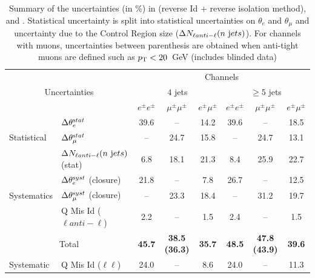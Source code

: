 \begin{table}
  \begin{center} 
{\small \begin{tabular}{|l|l|ccc|ccc|}
\hline \multicolumn{2}{|c|}{ } &  \multicolumn{6}{c|}{Channels} \\ \cline{3-8}
 \multicolumn{2}{|c|}{Uncertainties} &  \multicolumn{3}{c|}{$4$ jets} &  \multicolumn{3}{|c|}{$\ge 5$ jets} \\ \cline{3-8}
\multicolumn{2}{|c|}{} & $e^{\pm}e^{\pm}$ & $\mu^{\pm}\mu^{\pm}$ & $e^{\pm}\mu^{\pm}$ & $e^{\pm}e^{\pm}$ & $\mu^{\pm}\mu^{\pm}$ & $e^{\pm}\mu^{\pm}$  \\ \hline\hline

    &  $\Delta\theta_{e}^{\rm stat}$ & 39.6 & -- & 14.2 & 39.6 & -- & 18.5 \\ \cline{2-8}
   Statistical    &  $\Delta\theta_{\mu}^{\rm stat}$ & -- & 24.7 & 15.8 & -- & 24.7 & 13.1 \\ \cline{2-8}
    &  $\Delta N_{\ell anti-\ell}(n~ {\rm jets})$(stat) & 6.8 & 18.1 & 21.3 & 8.4 & 25.9 & 22.7 \\ \hline

    &  $\Delta\theta_{e}^{\rm syst}$ (closure) & 21.8 & -- & 7.8 & 26.7 & -- & 12.5 \\ \cline{2-8}
Systematics    &  $\Delta\theta_{\mu}^{\rm syst}$ (closure) & -- & 23.3 & 18.4 & -- & 31.2 & 19.7 \\ \cline{2-8}
    & Q Mis Id ($\ell anti-\ell$) & 2.2 & -- & 1.5 & 2.4 & -- & 1.5 \\ \hline

\multicolumn{2}{|c|}{Total} &\bf 45.7 &\bf 38.5 (36.3) &\bf 35.7 &\bf 48.5 &\bf 47.8 (43.9) &\bf 39.6 \\ \hline
Systematic    & Q Mis Id ($\ell\ell$) & 24.0 & -- & 8.6 & 24.0 & -- & 11.3 \\ \hline
\hline \end{tabular}}
\caption{ Summary of the uncertainties (in \%) in \ee (reverse Id + reverse isolation
  method), \mumu and \emu. Statistical uncertainty is split into statistical
  uncertainties on $\theta_{e}$ and $\theta_{\mu}$ and uncertainty due to the
  Control Region size ($\Delta N_{\ell anti-{\ell}}(n~ {\rm jets})$). For channels with muons, uncertainties
  between parenthesis are obtained when anti-tight muons are defined such as
  $p_{\rm T}<20$~GeV (includes blinded data) \label{tab:uncertainties}}
\end{center}  
 \end{table}


